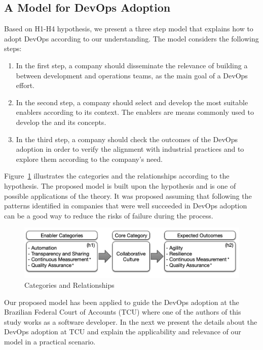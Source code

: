 \subsection{A Model for DevOps Adoption}\label{sec:case_study}

Based on H1-H4 hypothesis, we present a three step model that
explains how to adopt DevOps according to our understanding. The
model considers the following steps:

\begin{enumerate}
\item In the first step, a company should
  disseminate the relevance of building a \cc between
  development and operations teams, as the main
  goal of a DevOps effort.

\item In the second step, a company should select and develop
the most suitable enablers according to its context. The enablers
are means commonly used to develop the \cc and its concepts.

\item In the third step, a company should check the outcomes of the
DevOps adoption in order to verify the alignment with
industrial practices and to explore them according to the company's need.
\end{enumerate}

Figure~\ref{model} illustrates the categories and the
relationships according to the hypothesis. The proposed model is built upon
the hypothesis and is one of possible applications of the theory. It was proposed
assuming that following the patterns identified in companies that were
well succeeded in DevOps adoption can be a good way to reduce the risks of
failure during the process.

\begin{figure}
  \centering
  \includegraphics[width=.75\textwidth]{model.png}
  \caption{Categories and Relationships}
  \label{model}
\end{figure}


Our proposed model has been applied to guide the DevOps adoption at the
Brazilian Federal Court of Accounts (TCU) where one of the authors of this study
works as a software developer. In the next we present the details about the DevOps
adoption at TCU and explain the applicability and relevance of our model in a
practical scenario. 
